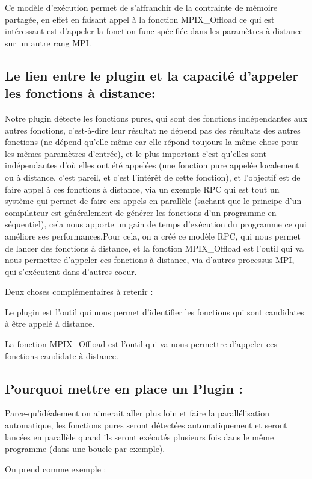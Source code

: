 \documentclass[12pt,a4paper]{article}
\begin{document}
Ce modèle d'exécution permet de s'affranchir de la contrainte de mémoire partagée, en effet en faisant appel à la fonction MPIX\_Offload ce qui est intéressant est d'appeler la fonction func spécifiée dans les paramètres à distance sur un autre rang MPI.

\subsection{Le lien entre le plugin et la capacité d'appeler les fonctions à distance:}
Notre plugin détecte les fonctions pures, qui sont des fonctions indépendantes aux autres fonctions, c'est-à-dire leur résultat ne dépend pas des résultats des autres fonctions (ne dépend qu'elle-même car elle répond toujours la même chose pour les mêmes paramètres d’entrée), et le plus important c'est qu'elles sont indépendantes d'où elles ont été appelées (une fonction pure appelée localement ou à distance, c'est pareil, et c'est l'intérêt de cette fonction), et l'objectif est de faire appel à ces fonctions à distance, via un exemple RPC qui est tout un système qui permet de faire ces appels en parallèle (sachant que le principe d'un compilateur est généralement de générer les fonctions d'un programme en séquentiel), cela nous apporte un gain de temps d’exécution du programme ce qui améliore ses performances.Pour cela, on a créé ce modèle RPC, qui nous permet de lancer des fonctions à distance, et la fonction MPIX\_Offload est l'outil qui va nous permettre d'appeler ces fonctions à distance, via d'autres processus MPI, qui s'exécutent dans d'autres coeur.

Deux choses complémentaires à retenir :

Le plugin est l'outil qui nous permet d'identifier les fonctions qui sont candidates à être appelé à distance.

La fonction MPIX\_Offload est l'outil qui va nous permettre d'appeler ces fonctions candidate à distance.

\subsection{Pourquoi mettre en place un Plugin :}

Parce-qu'idéalement on aimerait aller plus loin et faire la parallélisation automatique, les fonctions pures seront détectées automatiquement et seront lancées en parallèle quand ils seront exécutés plusieurs fois dans le même programme (dans une boucle par exemple).

On prend comme exemple :
\end{document}
